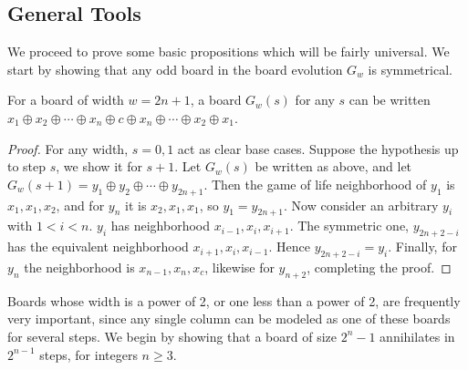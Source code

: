 \documentclass[12pt,letterpaper]{article}
\begin{document}
\subsection{General Tools}

We proceed to prove some basic propositions which will be fairly universal. We start by showing that any odd board in the board evolution $G_w$ is symmetrical.
\begin{prop}[Symmetry]\label{symmetry}
  For a board of width $w=2n+1$, a board $G_w(s)$ for any $s$ can be written $x_1\oplus x_2\oplus\cdots\oplus x_n\oplus c \oplus x_n\oplus\cdots\oplus x_2\oplus x_1$.
\end{prop}
\begin{proof}
  For any width, $s=0,1$ act as clear base cases. Suppose the hypothesis up to step $s$, we show it for $s+1$. Let $G_w(s)$ be written as above, and let $G_w(s+1)=y_1\oplus y_2\oplus\cdots\oplus y_{2n+1}$. Then the game of life neighborhood of $y_1$ is $x_1,x_1,x_2$, and for $y_n$ it is $x_2,x_1,x_1$, so $y_1=y_{2n+1}$. Now consider an arbitrary $y_i$ with $1<i<n$. $y_i$ has neighborhood $x_{i-1},x_i,x_{i+1}$. The symmetric one, $y_{2n+2-i}$ has the equivalent neighborhood $x_{i+1},x_i,x_{i-1}$. Hence $y_{2n+2-i}=y_i$. Finally, for $y_n$ the neighborhood is $x_{n-1}, x_n, x_c$, likewise for $y_{n+2}$, completing the proof.
\end{proof}


Boards whose width is a power of 2, or one less than a power of 2, are frequently very important, since any single column can be modeled as one of these boards for several steps. We begin by showing that a board of size $2^n-1$ annihilates in $2^{n-1}$ steps, for integers $n\geq 3$.
\end{document}
